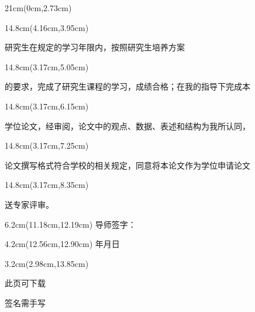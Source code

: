 \begin{titlepage}
    \thispagestyle{empty}
    \label{page:review}
    \null

\begin{textblock*}{21cm}(0cm,2.73cm)
\end{textblock*}

\begin{textblock*}{14.8cm}(4.16cm,3.95cm)
    {\kaishu{}\noindent 研究生\JOUUnderlineBox{2.85cm}{}在规定的学习年限内，按照研究生培养方案\par}
\end{textblock*}

\begin{textblock*}{14.8cm}(3.17cm,5.05cm)
    {\kaishu{}\noindent 的要求，完成了研究生课程的学习，成绩合格；在我的指导下完成本\par}
\end{textblock*}

\begin{textblock*}{14.8cm}(3.17cm,6.15cm)
    {\kaishu{}\noindent 学位论文，经审阅，论文中的观点、数据、表述和结构为我所认同，\par}
\end{textblock*}

\begin{textblock*}{14.8cm}(3.17cm,7.25cm)
    {\kaishu{}\noindent 论文撰写格式符合学校的相关规定，同意将本论文作为学位申请论文\par}
\end{textblock*}

\begin{textblock*}{14.8cm}(3.17cm,8.35cm)
    {\kaishu{}\noindent 送专家评审。\par}
\end{textblock*}

\begin{textblock*}{6.2cm}(11.18cm,12.19cm)
    {\songti{}导师签字：\JOUUnderlineBox{2.65cm}{}}
\end{textblock*}

\begin{textblock*}{4.2cm}(12.56cm,12.90cm)
    {\songti{}年\hspace{0.75cm}月\hspace{0.75cm}日}
\end{textblock*}

\begin{textblock*}{3.2cm}(2.98cm,13.85cm)
    {此页可下载\par 签名需手写}
\end{textblock*}
\vfill\null
\end{titlepage}
